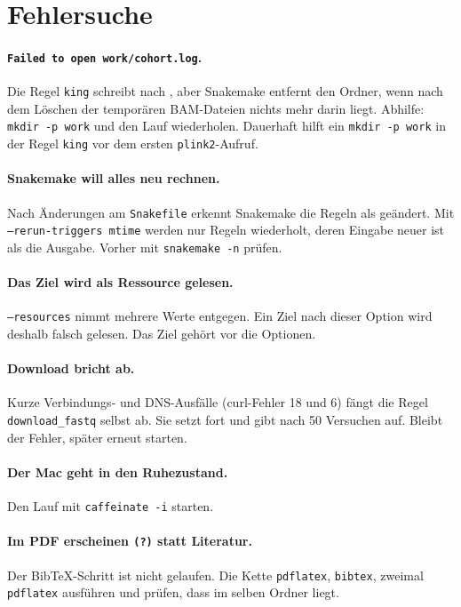 \documentclass[10pt,a4paper,twocolumn]{article}
\begin{document}
\section{Fehlersuche}
\paragraph{\texttt{Failed to open work/cohort.log}.} Die Regel \texttt{king} schreibt nach , aber Snakemake entfernt den Ordner, wenn nach dem Löschen der temporären BAM-Dateien nichts mehr darin liegt. Abhilfe: \texttt{mkdir -p work} und den Lauf wiederholen. Dauerhaft hilft ein \texttt{mkdir -p work} in der Regel \texttt{king} vor dem ersten \texttt{plink2}-Aufruf.

\paragraph{Snakemake will alles neu rechnen.} Nach Änderungen am \texttt{Snakefile} erkennt Snakemake die Regeln als geändert. Mit \texttt{--rerun-triggers mtime} werden nur Regeln wiederholt, deren Eingabe neuer ist als die Ausgabe. Vorher mit \texttt{snakemake -n} prüfen.

\paragraph{Das Ziel wird als Ressource gelesen.} \texttt{--resources} nimmt mehrere Werte entgegen. Ein Ziel nach dieser Option wird deshalb falsch gelesen. Das Ziel gehört vor die Optionen.

\paragraph{Download bricht ab.} Kurze Verbindungs- und DNS-Ausfälle (curl-Fehler 18 und 6) fängt die Regel \texttt{download\_fastq} selbst ab. Sie setzt fort und gibt nach 50 Versuchen auf. Bleibt der Fehler, später erneut starten.

\paragraph{Der Mac geht in den Ruhezustand.} Den Lauf mit \texttt{caffeinate -i} starten.

\paragraph{Im PDF erscheinen \texttt{(?)} statt Literatur.} Der BibTeX-Schritt ist nicht gelaufen. Die Kette \texttt{pdflatex}, \texttt{bibtex}, zweimal \texttt{pdflatex} ausführen und prüfen, dass  im selben Ordner liegt.
\end{document}
